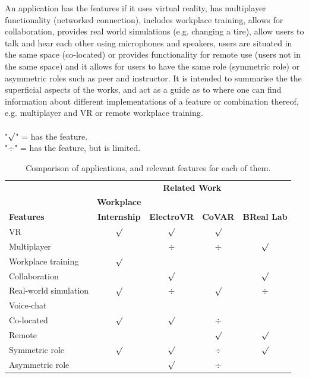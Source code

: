 An application has the features if it uses virtual reality, has multiplayer functionality (networked connection), includes workplace training, allows for collaboration, provides real world simulations (e.g. changing a tire), allow users to talk and hear each other using microphones and speakers, users are situated in the same space (co-located) or provides functionality for remote use (users not in the same space) and it allows for users to have the same role (symmetric role) or asymmetric roles such as peer and instructor.         
It is intended to summarise the the superficial aspects of the works, and act as a guide as to where one can find information about different implementations of a feature or combination thereof, e.g. multiplayer and VR or remote workplace training.  
\\
\newcommand*\ON[0]{$\surd$}
\newcommand*\LIM[0]{$\div$}
\\ "\ON" = has the feature.
\\ "\LIM" = has the feature, but is limited.

\begin{table}[!ht]
    \begin{center}
    \begin{tabular}{@{}l c c c c @{}}
           & \multicolumn{4}{c}{\textbf{Related Work}}
    \\  \cmidrule{2-5}
           & \textbf{Workplace}
    \\       
             \textbf{Features}
           & \textbf{Internship}
           & \textbf{ElectroVR}
           & \textbf{CoVAR}
           & \textbf{BReal Lab}
    \\ \midrule
       VR                           & \ON & \ON  & \ON  & 
    \\ Multiplayer                  &     & \LIM & \LIM & \ON
    \\ Workplace training           & \ON &      &      & 
    \\ Collaboration                &     & \ON  &      & \ON
    \\ Real-world simulation        & \ON & \LIM & \ON  & \LIM
    \\ Voice-chat                   &     &      &      & 
    \\ Co-located                   & \ON & \ON  & \LIM &  
    \\ Remote                       &     &      & \ON  & \ON    
    \\ Symmetric role               & \ON & \ON  & \LIM & \ON  
    \\ Asymmetric role              &     & \ON  & \LIM  &
    \\ \bottomrule
    \end{tabular}
    \captionsetup{width=1\linewidth}
    \caption{Comparison of applications, and relevant features for each of them.}
    \label{table:comparisonRelatedWork}
    \end{center}
\end{table}


